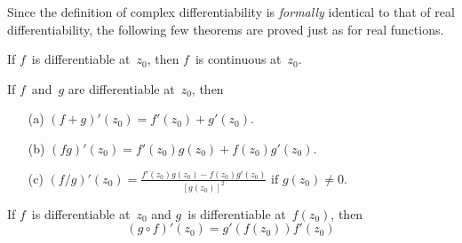 \noindent Since the definition of complex differentiability is \emph{formally} identical to that of real differentiability, the following few theorems are proved just as for real functions.

\begin{thm}
If \(f\)~is differentiable at~\(z_0\), then \(f\)~is continuous at~\(z_0\).
\end{thm}

\begin{thm}
If \(f\)~and~\(g\) are differentiable at~\(z_0\), then
\begin{enumerate}[itemsep=0pt]
\item[(a)] \((f+g)'(z_0)=f'(z_0)+g'(z_0)\).
\item[(b)] \((fg)'(z_0)=f'(z_0)g(z_0)+f(z_0)g'(z_0)\).
\item[(c)] \((f/g)'(z_0)=\displaystyle\frac{f'(z_0)g(z_0)-f(z_0)g'(z_0)}{[g(z_0)]^2}\text{ if }g(z_0)\ne0\).
\end{enumerate}
\end{thm}

\begin{thm}
If \(f\)~is differentiable at~\(z_0\) and \(g\)~is differentiable at~\(f(z_0)\), then
\[(g\circ f)'(z_0)=g'(f(z_0))f'(z_0)\]
\end{thm}

